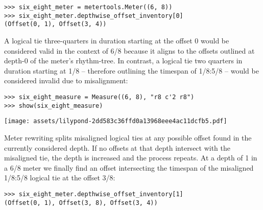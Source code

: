 \begin{singlespacing}
\vspace{-0.5\baselineskip}
\begin{lstlisting}
>>> six_eight_meter = metertools.Meter((6, 8))
>>> six_eight_meter.depthwise_offset_inventory[0]
(Offset(0, 1), Offset(3, 4))
\end{lstlisting}
\end{singlespacing}

\noindent A logical tie three-quarters in duration starting at the offset 0
would be considered valid in the context of 6/8 because it aligns to the
offsets outlined at depth-0 of the meter's rhythm-tree. In contrast, a logical
tie two quarters in duration starting at 1/8 -- therefore outlining the
timespan of 1/8:5/8 -- would be considered invalid due to misalignment:

\begin{comment}
<abjad>
six_eight_measure = Measure((6, 8), "r8 c'2 r8")
show(six_eight_measure)
</abjad>
\end{comment}

\begin{singlespacing}
\vspace{-0.5\baselineskip}
\begin{lstlisting}
>>> six_eight_measure = Measure((6, 8), "r8 c'2 r8")
>>> show(six_eight_measure)
\end{lstlisting}
\noindent\texttt{[image: assets/lilypond-2dd583c36ffd0a13968eee4ac11dcfb5.pdf]}
\end{singlespacing}

\noindent Meter rewriting splits misaligned logical ties at any possible offset
found in the currently considered depth. If no offsets at that depth intersect
with the misaligned tie, the depth is increased and the process repeats. At a
depth of 1 in a 6/8 meter we finally find an offset intersecting the timespan
of the misaligned 1/8:5/8 logical tie at the offset 3/8:

\begin{comment}
<abjad>
six_eight_meter.depthwise_offset_inventory[1]
</abjad>
\end{comment}

\begin{singlespacing}
\vspace{-0.5\baselineskip}
\begin{lstlisting}
>>> six_eight_meter.depthwise_offset_inventory[1]
(Offset(0, 1), Offset(3, 8), Offset(3, 4))
\end{lstlisting}
\end{singlespacing}

